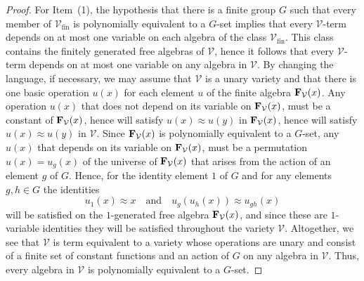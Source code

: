 \documentclass[12pt]{amsart}
\theoremstyle{definition}
\numberwithin{equation}{section}
\newcommand{\m}[1]{{\mathbf{\uppercase{#1}}}}
\begin{document}
\begin{proof}
For Item~(1), the hypothesis that   
there is a finite group $G$ such that
  every member of $\mathcal{V}_{\textrm{fin}}$ is polynomially
  equivalent to a $G$-set implies that every
$\mathcal{V}$-term depends on at most one variable
  on each algebra of the
  class $\mathcal{V}_{\textrm{fin}}$.
  This class contains the finitely generated free
  algebras of $\mathcal{V}$, hence it follows that
every $\mathcal{V}$-term depends on at most one variable
on any algebra in $\mathcal{V}$.
By changing the language, if necessary, we may
assume that $\mathcal{V}$ is a unary variety and
that there is one basic operation
$u(x)$ for each element $u$ of the finite
algebra $\m f_{\mathcal{V}}(x)$.
Any operation $u(x)$ that does not depend on its variable
on $\m f_{\mathcal{V}}(x)$,
must be a constant of $\m f_{\mathcal{V}}(x)$,
hence will satisfy $u(x)\approx u(y)$ in
$\m f_{\mathcal{V}}(x)$, hence will satisfy $u(x)\approx u(y)$
in $\mathcal{V}$.
Since $\m f_{\mathcal{V}}(x)$ is polynomially equivalent
to a $G$-set, any $u(x)$ that depends on its variable
on $\m f_{\mathcal{V}}(x)$,
must be a permutation $u(x)=u_g(x)$
of the universe of $\m f_{\mathcal{V}}(x)$
that arises from the action of an element $g$ of $G$.
Hence, for the identity element $1$ of $G$ and for
any elements $g,h\in G$ the identities
\begin{equation*}
  u_1(x)\approx x\quad\text{and}\quad u_g(u_h(x))\approx u_{gh}(x)
\end{equation*}
will be satisfied on
the $1$-generated free algebra
$\m f_{\mathcal{V}}(x)$, and since these are $1$-variable
identities they will be satisfied throughout the variety
$\mathcal{V}$.
Altogether, we see that $\mathcal{V}$
is term equivalent to a variety
whose operations
are unary and consist of a finite set of constant functions
and an action of $G$ 
on any algebra in $\mathcal{V}$.
Thus, every algebra in $\mathcal{V}$
is polynomially equivalent to a $G$-set.


\end{proof}
\end{document}
